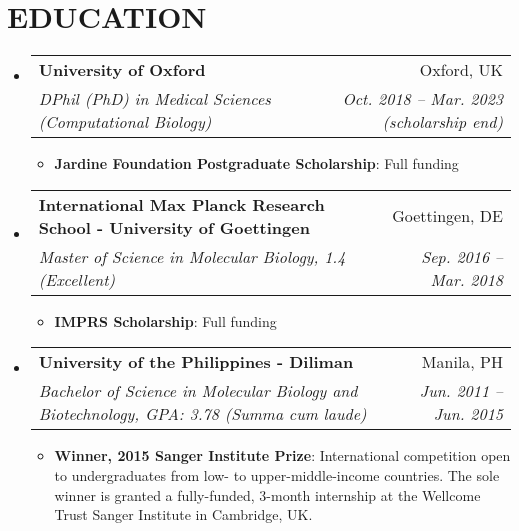 \documentclass[legalpaper,11pt]{article}
\makeatletter
\newcommand{\resumeItem}[2]{
  \item\small{
    \textbf{#1}{: #2 \vspace{-2pt}}
  }
}
\newcommand{\resumeSubheading}[4]{
  \vspace{-1pt}\item
    \begin{tabular*}{0.97\textwidth}[t]{l@{\extracolsep{\fill}}r}
      \textbf{#1} & #2 \\
      \textit{\small#3} & \textit{\small #4} \\
    \end{tabular*}\vspace{-5pt}
}
\newcommand{\resumeSubHeadingListStart}{\begin{itemize}[leftmargin=*]}
\newcommand{\resumeSubHeadingListEnd}{\end{itemize}}
\newcommand{\resumeItemListStart}{\begin{itemize}}
\newcommand{\resumeItemListEnd}{\end{itemize}\vspace{-5pt}}
\makeatother
\begin{document}

\section{EDUCATION}
  \resumeSubHeadingListStart
    \resumeSubheading
      {University of Oxford}{Oxford, UK}
      {DPhil (PhD) in Medical Sciences (Computational Biology)}{Oct. 2018 -- Mar. 2023 (scholarship end)}
      \resumeItemListStart
        \resumeItem{Jardine Foundation Postgraduate Scholarship}
        {Full funding}
      \resumeItemListEnd
    \resumeSubheading
      {International Max Planck Research School - University of Goettingen}{Goettingen, DE}
      {Master of Science in Molecular Biology,  1.4 (Excellent)}{Sep. 2016 -- Mar. 2018}
      \resumeItemListStart
        \resumeItem{IMPRS Scholarship}
          {Full funding}
      \resumeItemListEnd
      \resumeSubheading
      {University of the Philippines - Diliman}{Manila, PH}
      {Bachelor of Science in Molecular Biology and Biotechnology, GPA: 3.78 (\textit{Summa cum laude})}{Jun. 2011 -- Jun. 2015}
       \resumeItemListStart
          \resumeItem{Winner, 2015 Sanger Institute Prize}
          
          {International competition open to undergraduates from low- to upper-middle-income countries. The sole winner is granted a fully-funded, 3-month internship at the Wellcome Trust Sanger Institute in Cambridge, UK.}
      \resumeItemListEnd
  \resumeSubHeadingListEnd
  
  
\end{document}
